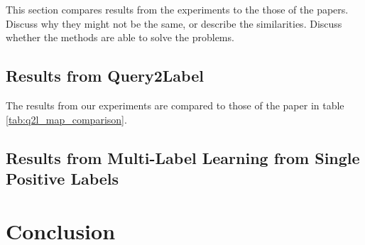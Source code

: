 \documentclass[lettersize,journal]{IEEEtran}
\begin{document}
This section compares results from the experiments to the those of the papers. Discuss why they might not be the same, or describe the similarities. Discuss whether the methods are able to solve the problems.


\subsection{Results from Query2Label}
The results from our experiments are compared to those of the paper in table \ref{tab:q2l_map_comparison}. 

\subsection{Results from Multi-Label Learning from Single Positive Labels}


\section{Conclusion}






\end{document}
